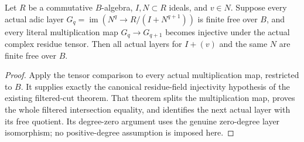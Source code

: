 \begin{theorem}
\label{hir:actual-base-complex-symbol-criterion}
\leanok
{}
Let $R$ be a commutative $B$-algebra, $I,N\subset R$ ideals, and
$v\in N$. Suppose every actual adic layer
$G_q=\operatorname{im}(N^q\to R/(I+N^{q+1}))$ is finite free over $B$,
and every literal multiplication map $G_q\to G_{q+1}$ becomes injective
under the actual complex residue tensor. Then all actual layers for
$I+(v)$ and the same $N$ are finite free over $B$.
\end{theorem}
\begin{proof}
Apply the tensor comparison to every actual multiplication map,
restricted to $B$. It supplies exactly the canonical residue-field
injectivity hypothesis of the existing filtered-cut theorem. That
theorem splits the multiplication map, proves the whole filtered
intersection equality, and identifies the next actual layer with its
free quotient. Its degree-zero argument uses the genuine zero-degree
layer isomorphism; no positive-degree assumption is imposed here.
\end{proof}
